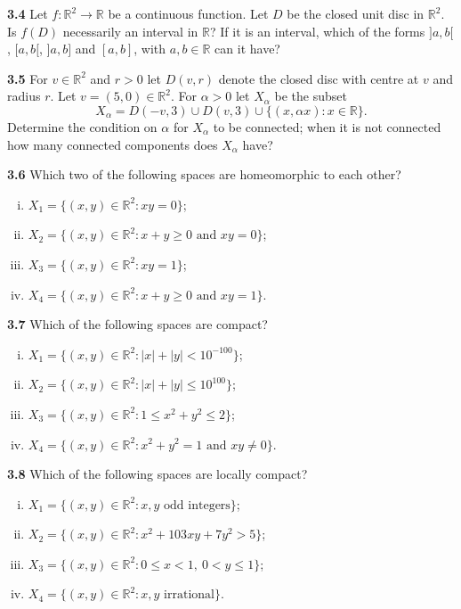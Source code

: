 \documentclass[11pt,a4paper]{article}
\newcommand{\R}{\mathbb{R}}
\newcommand{\qitem}[1]{\par\medskip\noindent\textbf{#1}\hspace{0.5em}}
\begin{document}
\qitem{3.4} Let $f : \R^2 \to \R$ be a continuous function. Let $D$ be the closed unit disc in $\R^2$. Is $f(D)$ necessarily an interval in $\R$? If it is an interval, which of the forms $]a, b[$, $[a, b[$, $]a, b]$ and $[a, b]$, with $a, b \in \R$ can it have?

\qitem{3.5} For $v \in \R^2$ and $r > 0$ let $D(v, r)$ denote the closed disc with centre at $v$ and radius $r$. Let $v = (5, 0) \in \R^2$. For $\alpha > 0$ let $X_\alpha$ be the subset
\[
  X_\alpha = D(-v, 3) \cup D(v, 3) \cup \{(x, \alpha x) : x \in \R\}.
\]
Determine the condition on $\alpha$ for $X_\alpha$ to be connected; when it is not connected how many connected components does $X_\alpha$ have?

\qitem{3.6} Which two of the following spaces are homeomorphic to each other?
\begin{enumerate}[i)]
  \item $X_1 = \{(x, y) \in \R^2 : xy = 0\}$;
  \item $X_2 = \{(x, y) \in \R^2 : x + y \ge 0 \text{ and } xy = 0\}$;
  \item $X_3 = \{(x, y) \in \R^2 : xy = 1\}$;
  \item $X_4 = \{(x, y) \in \R^2 : x + y \ge 0 \text{ and } xy = 1\}$.
\end{enumerate}

\qitem{3.7} Which of the following spaces are compact?
\begin{enumerate}[i)]
  \item $X_1 = \{(x, y) \in \R^2 : |x| + |y| < 10^{-100}\}$;
  \item $X_2 = \{(x, y) \in \R^2 : |x| + |y| \le 10^{100}\}$;
  \item $X_3 = \{(x, y) \in \R^2 : 1 \le x^2 + y^2 \le 2\}$;
  \item $X_4 = \{(x, y) \in \R^2 : x^2 + y^2 = 1 \text{ and } xy \neq 0\}$.
\end{enumerate}

\qitem{3.8} Which of the following spaces are locally compact?
\begin{enumerate}[i)]
  \item $X_1 = \{(x, y) \in \R^2 : x, y \text{ odd integers}\}$;
  \item $X_2 = \{(x, y) \in \R^2 : x^2 + 103xy + 7y^2 > 5\}$;
  \item $X_3 = \{(x, y) \in \R^2 : 0 \le x < 1,\ 0 < y \le 1\}$;
  \item $X_4 = \{(x, y) \in \R^2 : x, y \text{ irrational}\}$.
\end{enumerate}
\end{document}
